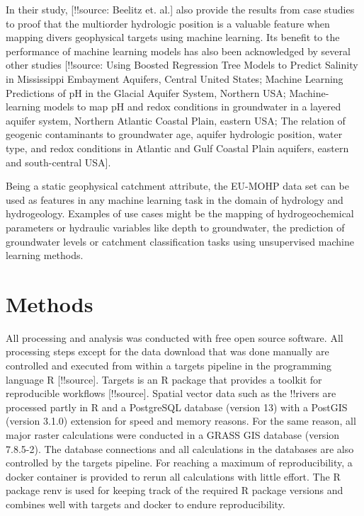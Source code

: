 \documentclass[fleqn,10pt]{wlscirep}
\begin{document}
In their study, {[}!!source: Beelitz et. al.{]} also provide the results from case studies to proof that the multiorder hydrologic position is a valuable feature when mapping divers geophysical targets using machine learning. Its benefit to the performance of machine learning models has also been acknowledged by several other studies {[}!!source: Using Boosted Regression Tree Models to Predict Salinity in Mississippi Embayment Aquifers, Central United States; Machine Learning Predictions of pH in the Glacial Aquifer System, Northern USA; Machine-learning models to map pH and redox conditions in groundwater in a layered aquifer system, Northern Atlantic Coastal Plain, eastern USA; The relation of geogenic contaminants to groundwater age, aquifer hydrologic position, water type, and redox conditions in Atlantic and Gulf Coastal Plain aquifers, eastern and south-central USA{]}.

Being a static geophysical catchment attribute, the EU-MOHP data set can be used as features in any machine learning task in the domain of hydrology and hydrogeology. Examples of use cases might be the mapping of hydrogeochemical parameters or hydraulic variables like depth to groundwater, the prediction of groundwater levels or catchment classification tasks using unsupervised machine learning methods.

\hypertarget{methods}{%
\section*{Methods}\label{methods}}

All processing and analysis was conducted with free open source software. All processing steps except for the data download that was done manually are controlled and executed from within a targets pipeline in the programming language R {[}!!source{]}. Targets is an R package that provides a toolkit for reproducible workflows {[}!!source{]}. Spatial vector data such as the !!rivers are processed partly in R and a PostgreSQL database (version 13) with a PostGIS (version 3.1.0) extension for speed and memory reasons. For the same reason, all major raster calculations were conducted in a GRASS GIS database (version 7.8.5-2). The database connections and all calculations in the databases are also controlled by the targets pipeline. For reaching a maximum of reproducibility, a docker container is provided to rerun all calculations with little effort. The R package renv is used for keeping track of the required R package versions and combines well with targets and docker to endure reproducibility.
\end{document}

